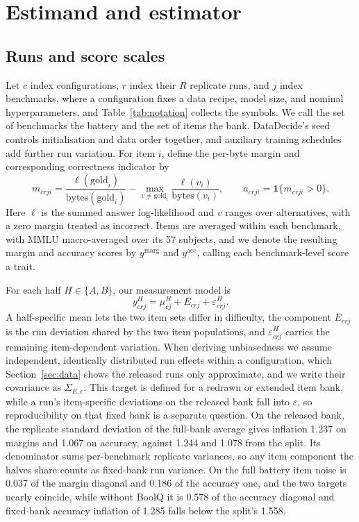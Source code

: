 \section{Estimand and estimator}
\label{sec:estimator}
\subsection{Runs and score scales}
Let $c$ index configurations, $r$ index their $R$ replicate runs, and $j$ index benchmarks, where a configuration fixes a data recipe, model size, and nominal hyperparameters, and Table~\ref{tab:notation} collects the symbols. We call the set of benchmarks the battery and the set of items the bank. DataDecide's seed controls initialisation and data order together, and auxiliary training schedules add further run variation. For item $i$, define the per-byte margin and corresponding correctness indicator by
\begin{equation}
m_{crji}=\frac{\ell(\mathrm{gold}_i)}{\mathrm{bytes}(\mathrm{gold}_i)}-
\max_{v\ne\mathrm{gold}_i}\frac{\ell(v_i)}{\mathrm{bytes}(v_i)},
\qquad a_{crji}=\mathbf{1}\{m_{crji}>0\}.
\label{eq:scores}
\end{equation}
Here $\ell$ is the summed answer log-likelihood and $v$ ranges over alternatives, with a zero margin treated as incorrect. Items are averaged within each benchmark, with MMLU macro-averaged over its 57 subjects, and we denote the resulting margin and accuracy scores by $y^{\mathrm{marg}}$ and $y^{\mathrm{acc}}$, calling each benchmark-level score a trait.

For each half $H\in\{A,B\}$, our measurement model is
\begin{equation}
y^H_{crj}=\mu^H_{cj}+E_{crj}+\varepsilon^H_{crj}.
\label{eq:model}
\end{equation}
A half-specific mean lets the two item sets differ in difficulty, the component $E_{crj}$ is the run deviation shared by the two item populations, and $\varepsilon^H_{crj}$ carries the remaining item-dependent variation. When deriving unbiasedness we assume independent, identically distributed run effects within a configuration, which Section~\ref{sec:data} shows the released runs only approximate, and we write their covariance as $\Sigma_{E,c}$. This target is defined for a redrawn or extended item bank, while a run's item-specific deviations on the released bank fall into $\varepsilon$, so reproducibility on that fixed bank is a separate question. On the released bank, the replicate standard deviation of the full-bank average gives inflation 1.237  on margins and 1.067  on accuracy, against 1.244 and 1.078 from the split. Its denominator sums per-benchmark replicate variances, so any item component the halves share counts as fixed-bank run variance. On the full battery item noise is 0.037 of the margin diagonal and 0.186 of the accuracy one, and the two targets nearly coincide, while without BoolQ it is 0.578 of the accuracy diagonal and fixed-bank accuracy inflation of 1.285 falls below the split's 1.558.

